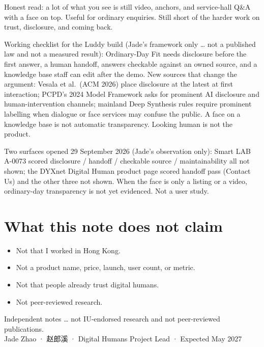 \documentclass[11pt,a4paper]{article}
\begin{document}
Honest read: a lot of what you see is still video, anchors, and service-hall Q\&A with a face on top.
Useful for ordinary enquiries. Still short of the harder work on trust, disclosure, and coming back.

Working checklist for the Luddy build (Jade's framework only \ldots{} not a published law and not a measured result): Ordinary-Day Fit needs disclosure before the first answer, a human handoff, answers checkable against an owned source, and a knowledge base staff can edit after the demo.
New sources that change the argument: Vesala et al.\ (ACM 2026) place disclosure at the latest at first interaction; PCPD's 2024 Model Framework asks for prominent AI disclosure and human-intervention channels; mainland Deep Synthesis rules require prominent labelling when dialogue or face services may confuse the public.
A face on a knowledge base is not automatic transparency. Looking human is not the product.

Two surfaces opened 29 September 2026 (Jade's observation only): Smart LAB A-0073 scored disclosure / handoff / checkable source / maintainability all not shown; the DYXnet Digital Human product page scored handoff pass (Contact Us) and the other three not shown.
When the face is only a listing or a video, ordinary-day transparency is not yet evidenced. Not a user study.

\section*{What this note does not claim}

\begin{itemize}
  \item Not that I worked in Hong Kong.
  \item Not a product name, price, launch, user count, or metric.
  \item Not that people already trust digital humans.
  \item Not peer-reviewed research.
\end{itemize}

\vspace{1.2em}
\noindent\small Independent notes \ldots{} not IU-endorsed research and not peer-reviewed publications.\\
Jade Zhao · 赵郎溪 · Digital Humans Project Lead · Expected May 2027
\end{document}
